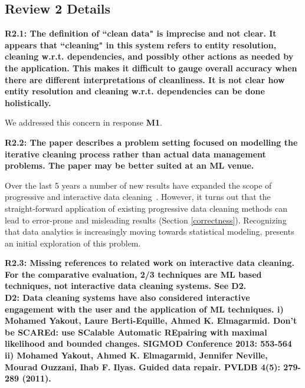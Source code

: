 \subsection*{Review 2 Details}

\noindent\textbf{R2.1: The definition of ``clean data" is imprecise and not clear. It appears that ``cleaning" in this system refers to entity resolution, cleaning w.r.t. dependencies, and possibly other actions as needed by the application. This makes it difficult to gauge overall accuracy when there are different interpretations of cleanliness. It is not clear how entity resolution and cleaning w.r.t. dependencies can be done holistically.}

We addressed this concern in response \textbf{M1}.

\vspace{0.5em}

\noindent\textbf{R2.2: The paper describes a problem setting focused on modelling the iterative cleaning process rather than actual data management problems. The paper may be better suited at an ML venue.}

Over the last 5 years a number of new results have expanded the scope of progressive and interactive data cleaning~\cite{mayfield2010eracer, DBLP:journals/pvldb/YakoutENOI11, yakout2013don, altowim2014progressive, whang2014incremental, papenbrock2015progressive, gruenheid2014incremental}.
However,  it turns out that the straight-forward application of existing progressive data cleaning methods can lead to error-prone and misleading results (Section \ref{correctness}).
Recognizing that data analytics is increasingly moving towards statistical modeling, \sys presents an initial exploration of this problem.  

\vspace{0.5em}

\noindent\textbf{R2.3: Missing references to related work on interactive data cleaning. For the comparative evaluation, 2/3 techniques are ML based techniques, not interactive data cleaning systems. See D2.\\
D2: Data cleaning systems have also considered interactive engagement with the user and the application of ML techniques. 
i) Mohamed Yakout, Laure Berti-Equille, Ahmed K. Elmagarmid. Don't be SCAREd: use SCalable Automatic REpairing with maximal likelihood and bounded changes. SIGMOD Conference 2013: 553-564
ii) Mohamed Yakout, Ahmed K. Elmagarmid, Jennifer Neville, Mourad Ouzzani, Ihab F. Ilyas.
Guided data repair. PVLDB 4(5): 279-289 (2011).
}

